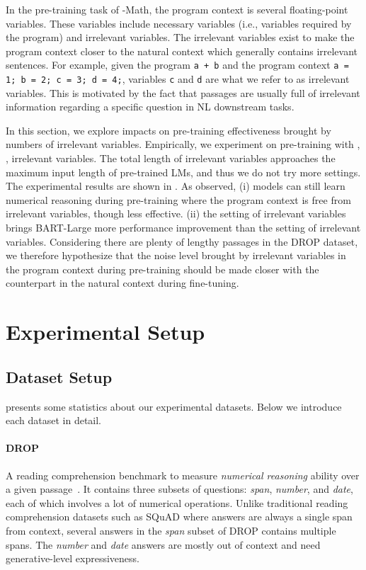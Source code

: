In the pre-training task of \ours-Math, the program context is several floating-point variables.
These variables include necessary variables (i.e., variables required by the program) and irrelevant variables.
The irrelevant variables exist to make the program context closer to the natural context which generally contains irrelevant sentences.
For example, given the program \texttt{\small a + b} and the program context \texttt{\small a = 1; b = 2; c = 3; d = 4;}, variables \texttt{\small c} and \texttt{\small d} are what we refer to as irrelevant variables.
This is motivated by the fact that passages are usually full of irrelevant information regarding a specific question in NL downstream tasks.

In this section, we explore impacts on pre-training effectiveness brought by numbers of irrelevant variables.
Empirically, we experiment on pre-training with , ,  irrelevant variables.
The total length of  irrelevant variables approaches the maximum input length of pre-trained LMs, and thus we do not try more settings.
The experimental results are shown in .
As observed, (i) models can still learn numerical reasoning during pre-training where the program context is free from irrelevant variables, though less effective. (ii) the setting of  irrelevant variables brings BART-Large more performance improvement than the setting of  irrelevant variables.
Considering there are plenty of lengthy passages in the DROP dataset, we therefore hypothesize that the noise level brought by irrelevant variables in the program context during pre-training should be made closer with the counterpart in the natural context during fine-tuning.

\section{Experimental Setup}\label{sec:append_dataset}

\subsection{Dataset Setup}

 presents some statistics about our experimental datasets.
Below we introduce each dataset in detail.

\paragraph{DROP} A reading comprehension benchmark to measure \textit{numerical reasoning} ability over a given passage~\cite{dua-etal-2019-drop}.
It contains three subsets of questions: \textit{span}, \textit{number}, and \textit{date}, each of which involves a lot of numerical operations. Unlike traditional reading comprehension datasets such as SQuAD \cite{rajpurkar-etal-2016-squad} where answers are always a single span from context, several answers in the \textit{span} subset of DROP contains multiple spans.
The \textit{number} and \textit{date} answers are mostly out of context and need generative-level expressiveness.

